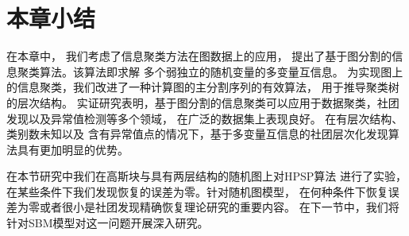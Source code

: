 \section{本章小结}
在本章中，
我们考虑了信息聚类方法在图数据上的应用，
提出了基于图分割的信息聚类算法。该算法即求解
多个弱独立的随机变量的多变量互信息。
为实现图上的信息聚类，我们改进了一种计算图的主分割序列的有效算法，
用于推导聚类树的层次结构。
实证研究表明，基于图分割的信息聚类可以应用于数据聚类，社团发现以及异常值检测等多个领域，
在广泛的数据集上表现良好。
在有层次结构、类别数未知以及
含有异常值点的情况下，基于多变量互信息的社团层次化发现算法具有更加明显的优势。

在本节研究中我们在高斯块与具有两层结构的随机图上对HPSP算法
进行了实验，在某些条件下我们发现恢复的误差为零。针对随机图模型，
在何种条件下恢复误差为零或者很小是社团发现精确恢复理论研究的重要内容。
在下一节中，我们将针对SBM模型对这一问题开展深入研究。
